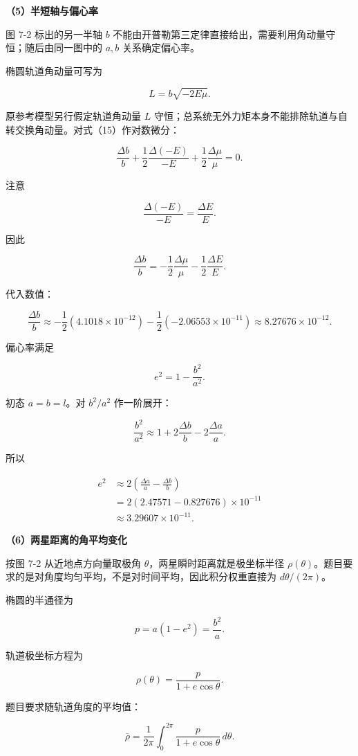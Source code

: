 \documentclass[12pt,a4paper,UTF8]{ctexart}
\begin{document}
\textbf{（5）半短轴与偏心率}

图 7-2 标出的另一半轴 \(b\)
不能由开普勒第三定律直接给出，需要利用角动量守恒；随后由同一图中的
\(a,b\) 关系确定偏心率。

椭圆轨道角动量可写为

\[
L=b\sqrt{-2E\mu}.
\tag{15}
\]

原参考模型另行假定轨道角动量 \(L\)
守恒；总系统无外力矩本身不能排除轨道与自转交换角动量。对式（15）作对数微分：

\[
\frac{\Delta b}{b}
+\frac12\frac{\Delta(-E)}{-E}
+\frac12\frac{\Delta\mu}{\mu}=0.
\]

注意

\[
\frac{\Delta(-E)}{-E}=\frac{\Delta E}{E}.
\]

因此

\[
\boxed{
\frac{\Delta b}{b}
=-\frac12\frac{\Delta\mu}{\mu}
-\frac12\frac{\Delta E}{E}
}.
\tag{16}
\]

代入数值：

\[
\frac{\Delta b}{b}
\approx-\frac12(4.1018\times10^{-12})
-\frac12(-2.06553\times10^{-11})
\approx8.27676\times10^{-12}.
\tag{17}
\]

偏心率满足

\[
e^2=1-\frac{b^2}{a^2}.
\]

初态 \(a=b=l\)。对 \(b^2/a^2\) 作一阶展开：

\[
\frac{b^2}{a^2}
\approx1+2\frac{\Delta b}{b}-2\frac{\Delta a}{a}.
\]

所以

\[
\begin{aligned}
e^2
&\approx2\left(\frac{\Delta a}{a}-\frac{\Delta b}{b}\right)\\
&=2(2.47571-0.827676)\times10^{-11}\\
&\approx3.29607\times10^{-11}.
\end{aligned}
\tag{18}
\]

\textbf{（6）两星距离的角平均变化}

按图 7-2 从近地点方向量取极角 \(\theta\)，两星瞬时距离就是极坐标半径
\(\rho(\theta)\)。题目要求的是对角度均匀平均，不是对时间平均，因此积分权重直接为
\(d\theta/(2\pi)\)。

椭圆的半通径为

\[
p=a(1-e^2)=\frac{b^2}{a}.
\]

轨道极坐标方程为

\[
\rho(\theta)=\frac{p}{1+e\cos\theta}.
\tag{19}
\]

题目要求随轨道角度的平均值：

\[
\overline\rho
=\frac1{2\pi}\int_0^{2\pi}\frac{p}{1+e\cos\theta}\,d\theta.
\]
\end{document}
